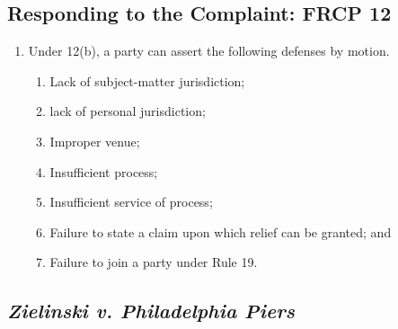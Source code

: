 \subsection{Responding to the Complaint: FRCP 12}

\begin{enumerate}
    \item Under 12(b), a party can assert the following defenses by motion.
    \begin{enumerate}
        \item Lack of subject-matter jurisdiction;
        \item lack of personal jurisdiction;
        \item Improper venue;
        \item Insufficient process;
        \item Insufficient service of process;
        \item Failure to state a claim upon which relief can be granted; and
        \item Failure to join a party under Rule 19.
    \end{enumerate}
\end{enumerate}

\subsection{\emph{Zielinski v. Philadelphia Piers}}

